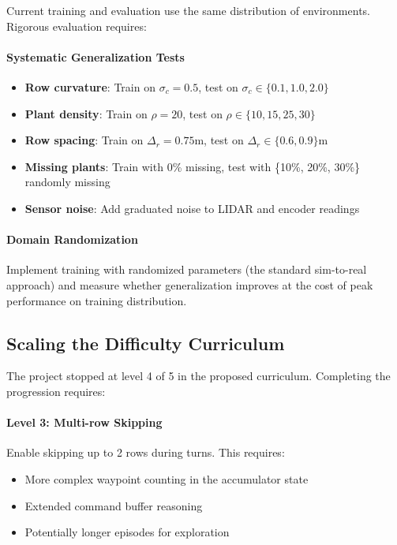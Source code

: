 \documentclass[11pt,a4paper,twocolumn]{article}
\begin{document}
Current training and evaluation use the same distribution of environments. Rigorous evaluation requires:

\paragraph{Systematic Generalization Tests}
\begin{itemize}
    \item \textbf{Row curvature}: Train on $\sigma_c = 0.5$, test on $\sigma_c \in \{0.1, 1.0, 2.0\}$
    \item \textbf{Plant density}: Train on $\rho = 20$, test on $\rho \in \{10, 15, 25, 30\}$
    \item \textbf{Row spacing}: Train on $\Delta_r = 0.75$m, test on $\Delta_r \in \{0.6, 0.9\}$m
    \item \textbf{Missing plants}: Train with 0\% missing, test with \{10\%, 20\%, 30\%\} randomly missing
    \item \textbf{Sensor noise}: Add graduated noise to LIDAR and encoder readings
\end{itemize}

\paragraph{Domain Randomization}
Implement training with randomized parameters (the standard sim-to-real approach) and measure whether generalization improves at the cost of peak performance on training distribution.

\subsection{Scaling the Difficulty Curriculum}

The project stopped at level 4 of 5 in the proposed curriculum. Completing the progression requires:

\paragraph{Level 3: Multi-row Skipping}
Enable skipping up to 2 rows during turns. This requires:
\begin{itemize}
    \item More complex waypoint counting in the accumulator state
    \item Extended command buffer reasoning
    \item Potentially longer episodes for exploration
\end{itemize}
\end{document}
